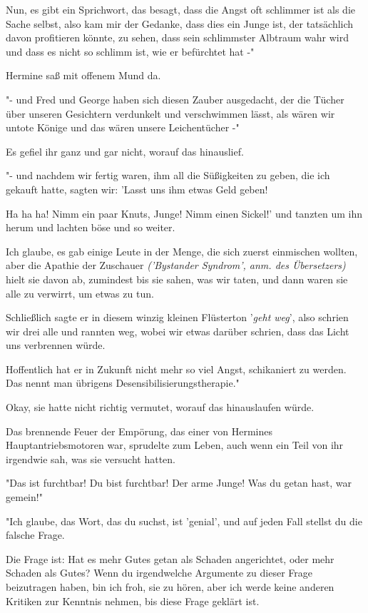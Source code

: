 {Nun, es gibt ein Sprichwort, das besagt, dass die Angst oft schlimmer ist als die Sache selbst, also kam mir der Gedanke, dass dies ein Junge ist, der tatsächlich davon profitieren könnte, zu sehen, dass sein schlimmster Albtraum wahr wird und dass es nicht so schlimm ist, wie er befürchtet hat -"

Hermine saß mit offenem Mund da.

"- und Fred und George haben sich diesen Zauber ausgedacht, der die Tücher über unseren Gesichtern verdunkelt und verschwimmen lässt, als wären wir untote Könige und das wären unsere Leichentücher -"

Es gefiel ihr ganz und gar nicht, worauf das hinauslief.

"- und nachdem wir fertig waren, ihm all die Süßigkeiten zu geben, die ich gekauft hatte, sagten wir: 'Lasst uns ihm etwas Geld geben!

Ha ha ha! Nimm ein paar Knuts, Junge! Nimm einen Sickel!' und tanzten um ihn herum und lachten böse und so weiter.

Ich glaube, es gab einige Leute in der Menge, die sich zuerst einmischen wollten, aber die Apathie der Zuschauer \emph{('Bystander Syndrom', anm. des Übersetzers)} hielt sie davon ab, zumindest bis sie sahen, was wir taten, und dann waren sie alle zu verwirrt, um etwas zu tun.

Schließlich sagte er in diesem winzig kleinen Flüsterton '\emph{geht weg}', also schrien wir drei alle und rannten weg, wobei wir etwas darüber schrien, dass das Licht uns verbrennen würde.

Hoffentlich hat er in Zukunft nicht mehr so viel Angst, schikaniert zu werden. Das nennt man übrigens Desensibilisierungstherapie."

Okay, sie hatte nicht richtig vermutet, worauf das hinauslaufen würde.

Das brennende Feuer der Empörung, das einer von Hermines Hauptantriebsmotoren war, sprudelte zum Leben, auch wenn ein Teil von ihr irgendwie sah, was sie versucht hatten.

"Das ist furchtbar! Du bist furchtbar! Der arme Junge! Was du getan hast, war gemein!"

"Ich glaube, das Wort, das du suchst, ist 'genial', und auf jeden Fall stellst du die falsche Frage.

Die Frage ist: Hat es mehr Gutes getan als Schaden angerichtet, oder mehr Schaden als Gutes? Wenn du irgendwelche Argumente zu dieser Frage beizutragen haben, bin ich froh, sie zu hören, aber ich werde keine anderen Kritiken zur Kenntnis nehmen, bis diese Frage geklärt ist.

}
